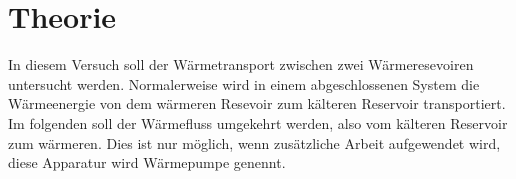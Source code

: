 \section{Theorie}
In diesem Versuch soll der Wärmetransport zwischen zwei Wärmeresevoiren untersucht werden.
Normalerweise wird in einem abgeschlossenen System die Wärmeenergie von dem wärmeren Resevoir zum
kälteren Reservoir transportiert. Im folgenden soll der Wärmefluss umgekehrt werden, also vom
kälteren Reservoir zum wärmeren. Dies ist nur möglich, wenn zusätzliche Arbeit
aufgewendet wird, diese Apparatur wird Wärmepumpe genennt.


\label{sec:Theorie}

